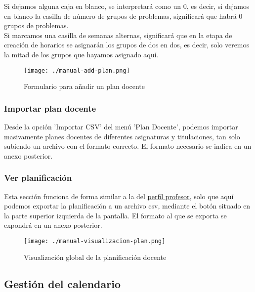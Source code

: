 Si dejamos alguna caja en blanco, se interpretará como un 0, es decir, si dejamos en blanco la casilla de número de grupos de problemas, significará que habrá 0 grupos de problemas.\\

Si marcamos una casilla de semanas alternas, significará que en la etapa de creación de horarios se asignarán los grupos de dos en dos, es decir, solo veremos la mitad de los grupos que hayamos asignado aquí.

\begin{figure}[H] 
  \label{manual-add-plan} 
	\begin{center}
    \texttt{[image: ./manual-add-plan.png]}
  \end{center}
\caption{Formulario para añadir un plan docente}
\end{figure}

\subsubsection{Importar plan docente}

Desde la opción 'Importar CSV' del menú 'Plan Docente', podemos importar masivamente planes docentes de diferentes asignaturas y titulaciones, tan solo subiendo un archivo con el formato correcto.
El formato necesario se indica en un anexo posterior.

\subsubsection{Ver planificación}

Esta sección funciona de forma similar a la del \hyperref[manual_perfil_profesor]{perfil profesor}, solo que aquí podemos exportar la planificación a un archivo csv, mediante el botón situado en la parte superior izquierda de la pantalla. El formato al que se exporta se expondrá en un anexo posterior.

\begin{figure}[H] 
  \label{manual-visualizacion-plan} 
	\begin{center}
    \texttt{[image: ./manual-visualizacion-plan.png]}
  \end{center}
\caption{Visualización global de la planificación docente}
\end{figure}

\subsection{Gestión del calendario}


